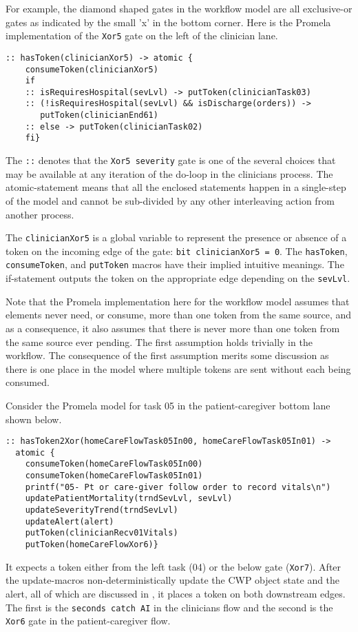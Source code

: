 For example, the diamond shaped gates in the workflow model are all exclusive-or gates as indicated by the small 'x' in the bottom corner. Here is the Promela implementation of the \texttt{Xor5} gate on the left of the clinician lane.
%
{\small
\begin{lstlisting}[style=myPromela]
:: hasToken(clinicianXor5) -> atomic { 
    consumeToken(clinicianXor5)
    if
    :: isRequiresHospital(sevLvl) -> putToken(clinicianTask03)
    :: (!isRequiresHospital(sevLvl) && isDischarge(orders)) -> 
       putToken(clinicianEnd61)
    :: else -> putToken(clinicianTask02)
    fi}
\end{lstlisting}
}
% 
\noindent The \texttt{::} denotes that the \texttt{Xor5 severity} gate is one of the several choices that may be available at any iteration of the do-loop in the clinicians process. The atomic-statement means that all the enclosed statements happen in a single-step of the model and cannot be sub-divided by any other interleaving action from another process.

The \texttt{clinicianXor5} is a global variable to represent the presence or absence of a token on the incoming edge of the gate: \texttt{bit clinicianXor5 = 0}. The \texttt{hasToken}, \texttt{consumeToken}, and \texttt{putToken} macros have their implied intuitive meanings. The if-statement outputs the token on the appropriate edge depending on the \texttt{sevLvl}. 

Note that the Promela implementation here for the workflow model assumes that elements never need, or consume, more than one token from the same source, and as a consequence, it also assumes that there is never more than one token from the same source ever pending. The first assumption holds trivially in the workflow. The consequence of the first assumption merits some discussion as there is one place in the model where multiple tokens are sent without each being consumed.

Consider the Promela model for task 05 in the patient-caregiver bottom lane shown below.
%
{\small
\begin{lstlisting}[style=myPromela]
:: hasToken2Xor(homeCareFlowTask05In00, homeCareFlowTask05In01) -> 
  atomic {
    consumeToken(homeCareFlowTask05In00)
    consumeToken(homeCareFlowTask05In01)
    printf("05- Pt or care-giver follow order to record vitals\n")
    updatePatientMortality(trndSevLvl, sevLvl)
    updateSeverityTrend(trndSevLvl)
    updateAlert(alert)
    putToken(clinicianRecv01Vitals)
    putToken(homeCareFlowXor6)}
\end{lstlisting}
}
%
\noindent It expects a token either from the left task (04) or the below gate (\texttt{Xor7}). After the update-macros non-deterministically update the CWP object state and the alert, all of which are discussed in , it places a token on both downstream edges. The first is the \texttt{seconds catch AI} in the clinicians flow and the second is the \texttt{Xor6} gate in the patient-caregiver flow. 

